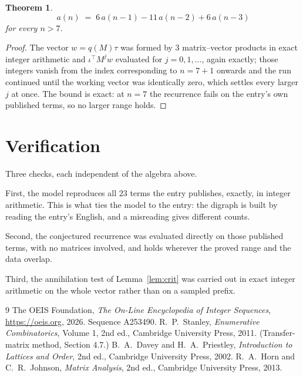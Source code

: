 \documentclass[11pt,a4paper]{article}
\theoremstyle{plain}
\newtheorem{theorem}{Theorem}
\theoremstyle{definition}
\begin{document}
\begin{theorem}
\[
a(n)\;=\;6\,a(n-1) - 11\,a(n-2) + 6\,a(n-3)
\]
for every $n>7$.
\end{theorem}

\begin{proof}
The vector $w=q(M)\tau$ was formed by $3$ matrix--vector products in exact integer
arithmetic and $\iota^{\!\top}M^{j}w$ evaluated for $j=0,1,\dots$, again exactly; those
integers vanish from the index corresponding to $n=7+1$ onwards and the run continued
until the working vector was identically zero, which settles every larger $j$ at once. The bound is exact: at $n=7$ the recurrence fails on the entry's own published terms, so no larger range holds.
\end{proof}

\section{Verification}

Three checks, each independent of the algebra above.

First, the model reproduces all $23$ terms the entry publishes, exactly, in integer
arithmetic. This is what ties the model to the entry: the digraph is built by reading the
entry's English, and a misreading gives different counts.

Second, the conjectured recurrence was evaluated directly on those published terms, with no
matrices involved, and holds wherever the proved range and the data overlap.

Third, the annihilation test of Lemma~\ref{lem:crit} was carried out in exact integer
arithmetic on the whole vector rather than on a sampled prefix.

\begin{thebibliography}{9}
 The OEIS Foundation, \emph{The On-Line Encyclopedia of Integer
Sequences}, \url{https://oeis.org}, 2026. Sequence A253490.
 R.~P.~Stanley, \emph{Enumerative Combinatorics}, Volume 1, 2nd ed.,
Cambridge University Press, 2011. (Transfer-matrix method, Section 4.7.)
 B.~A.~Davey and H.~A.~Priestley, \emph{Introduction to Lattices and
Order}, 2nd ed., Cambridge University Press, 2002.
 R.~A.~Horn and C.~R.~Johnson, \emph{Matrix Analysis}, 2nd ed., Cambridge
University Press, 2013.
\end{thebibliography}
\end{document}
